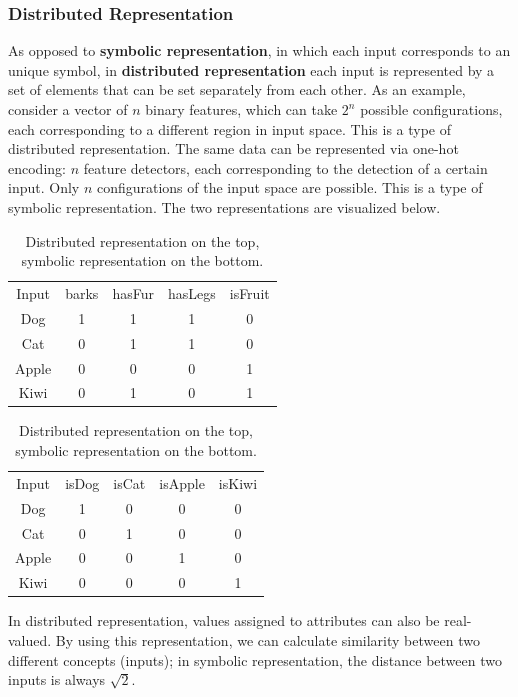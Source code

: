\subsubsection{Distributed Representation}

As opposed to \textbf{symbolic representation}, in which each input corresponds to an unique symbol, in \textbf{distributed representation} each input is represented by a set of elements that can be set separately from each other. As an example, consider a vector of $n$ binary features, which can take $2^n$ possible configurations, each corresponding to a different region in input space. This is a type of distributed representation. The same data can be represented via one-hot encoding: $n$ feature detectors, each corresponding to the detection of a certain input. Only $n$ configurations of the input space are possible. This is a type of symbolic representation. The two representations are visualized below.

\begin{table}[h]
    \centering
    \begin{tabular}{|c|cccc|}
        \hline
        \rowcolor{gray}
        Input & barks & hasFur & hasLegs & isFruit \\
        Dog & 1 & 1 & 1 & 0 \\
        Cat & 0 & 1 & 1 & 0\\
        Apple & 0 & 0 & 0 & 1\\
        Kiwi & 0 & 1 & 0 & 1\\
        \hline
    \end{tabular} 
\quad
    \begin{tabular}{|c|cccc|}
        \hline
        \rowcolor{gray}
        Input & isDog & isCat & isApple & isKiwi \\
        Dog & 1 & 0 & 0 & 0 \\
        Cat & 0 & 1 & 0 & 0 \\
        Apple & 0 & 0 & 1 & 0 \\
        Kiwi & 0 & 0 & 0 & 1 \\
        \hline
    \end{tabular}
    \caption{Distributed representation on the top, symbolic representation on the bottom.}
\end{table}

In distributed representation, values assigned to attributes can also be real-valued. By using this representation, we can calculate similarity between two different concepts (inputs); in symbolic representation, the distance between two inputs is always $\sqrt{2}$.

